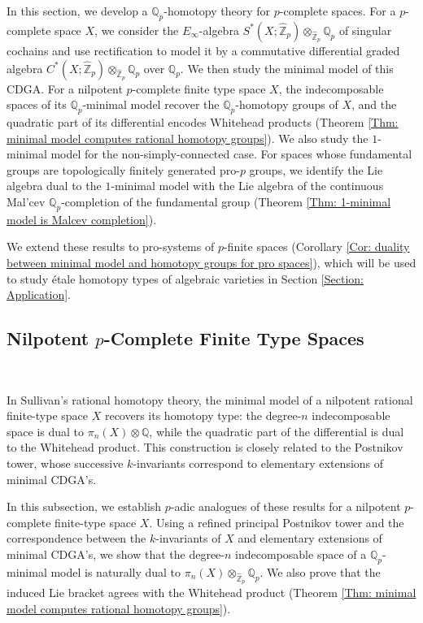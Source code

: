 \documentclass[11pt]{amsart}
\theoremstyle{definition}
\numberwithin{equation}{section}
\numberwithin{equation}{section}
\newcommand\QQ{\mathbb{Q}}
\newcommand\ZZ{\mathbb{Z}}
\begin{document}
In this section, we develop a $\QQ_p$-homotopy theory for $p$-complete spaces. For a $p$-complete space $X$, we consider the $E_\infty$-algebra
$S^*(X;\widehat{\ZZ}_p)\otimes_{\widehat{\ZZ}_p}\QQ_p$
of singular cochains and use rectification to model it by a commutative differential graded algebra $C^*(X;\widehat{\ZZ}_p)\otimes_{\widehat{\ZZ}_p}\QQ_p$ over $\mathbb Q_p$.
We then study the minimal model of this CDGA. For a nilpotent $p$-complete finite type space $X$, the indecomposable spaces of its $\QQ_{p}$-minimal model recover the $\QQ_p$-homotopy groups of $X$, and the quadratic part of its differential encodes Whitehead products (Theorem \ref{Thm: minimal model computes rational homotopy groups}). We also study the $1$-minimal model for the non-simply-connected case. For spaces whose fundamental groups are topologically finitely generated pro-$p$ groups, we identify the Lie algebra dual to the $1$-minimal model with the Lie algebra of the continuous Mal’cev $\QQ_p$-completion of the fundamental group (Theorem \ref{Thm: 1-minimal model is Malcev completion}). 

We extend these results to pro-systems of $p$-finite spaces (Corollary \ref{Cor: duality between minimal model and homotopy groups for pro spaces}), which will be used to study étale homotopy types of algebraic varieties in Section \ref{Section: Application}.


\subsection{Nilpotent $p$-Complete Finite Type Spaces}\,

In Sullivan’s rational homotopy theory, the minimal model of a nilpotent rational finite-type space $X$ recovers its homotopy type: the degree-$n$ indecomposable space is dual to $\pi_n(X)\otimes \mathbb{Q}$, while the quadratic part of the differential is dual to the Whitehead product. This construction is closely related to the Postnikov tower, whose successive $k$-invariants correspond to elementary extensions of minimal CDGA's.

In this subsection, we establish $p$-adic analogues of these results for a nilpotent $p$-complete finite-type space $X$. Using a refined principal Postnikov tower and the correspondence between the $k$-invariants of $X$ and elementary extensions of minimal CDGA's, we show that the degree-$n$ indecomposable space of a $\QQ_p$-minimal model is naturally dual to $\pi_n(X)\otimes_{\widehat{\ZZ}_{p}} \QQ_p$. We also prove that the induced Lie bracket agrees with the Whitehead product (Theorem \ref{Thm: minimal model computes rational homotopy groups}).
\end{document}
